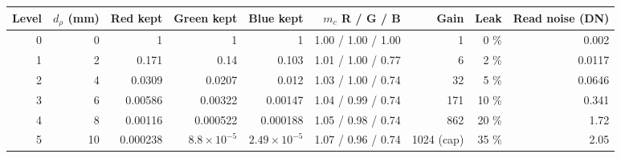 {\footnotesize\setlength{\tabcolsep}{4pt}
\begin{tabular}{rrrrrrrrr}
\toprule
Level & $d_\rho$ (mm) & Red kept & Green kept & Blue kept & $m_c$ R / G / B & Gain & Leak & Read noise (DN) \\
\midrule
0 & 0 & 1 & 1 & 1 & 1.00 / 1.00 / 1.00 & 1 & 0 \% & 0.002 \\
1 & 2 & 0.171 & 0.14 & 0.103 & 1.01 / 1.00 / 0.77 & 6 & 2 \% & 0.0117 \\
2 & 4 & 0.0309 & 0.0207 & 0.012 & 1.03 / 1.00 / 0.74 & 32 & 5 \% & 0.0646 \\
3 & 6 & 0.00586 & 0.00322 & 0.00147 & 1.04 / 0.99 / 0.74 & 171 & 10 \% & 0.341 \\
4 & 8 & 0.00116 & 0.000522 & 0.000188 & 1.05 / 0.98 / 0.74 & 862 & 20 \% & 1.72 \\
5 & 10 & 0.000238 & $8.8\times10^{-5}$ & $2.49\times10^{-5}$ & 1.07 / 0.96 / 0.74 & 1024 (cap) & 35 \% & 2.05 \\
\bottomrule
\end{tabular}}

